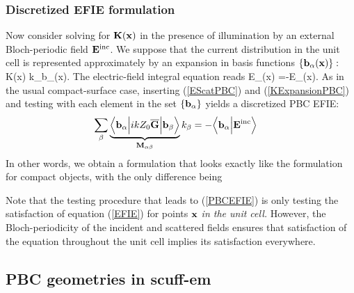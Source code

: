 \subsubsection{Discretized EFIE formulation}

Now consider solving for $\mathbf{K}(\mathbf{x})$ in the presence
of illumination by an external Bloch-periodic 
field $\mathbf{E}^{\hbox{\scriptsize{inc}}}$.
We suppose that the current distribution in the unit cell 
is represented approximately by an expansion in basis
functions $\{\mathbf{b}_\alpha(\mathbf{x})\}:$
{\vb K(\vb x) \approx k_\alpha \vb b_\alpha(\vb x).}
The electric-field integral equation reads
{\vb E_\parallel(\vb x)
   =-\vb E_\parallel(\vb x).
}
As in the usual compact-surface case, inserting (\ref{EScatPBC}) 
and (\ref{KExpansionPBC}) and testing with each element in the set 
$\{\mathbf{b}_\alpha\}$ yields a discretized PBC EFIE:
\begin{align}
 \sum_{\beta}
 \underbrace{
   \Big \langle \mathbf{b}_\alpha \Big|
   ikZ_0\overline{\mathbf{G}}    
   \Big| \mathbf{b}_\beta \Big\rangle
            }_{\mathbf{M}_{\alpha\beta}} 
   k_\beta
&=-\Big \langle \mathbf{b}_\alpha \Big | \mathbf{E}^{\hbox{\scriptsize{inc}}} \Big\rangle
\label{PBCEFIE}
\end{align}
In other words, we obtain a formulation that looks exactly
like the formulation for compact objects, with the only
difference being 

Note that the testing procedure that leads to 
(\ref{PBCEFIE}) is only testing the satisfaction
of equation (\ref{EFIE}) for points $\mathbf{x}$
\textit{in the unit cell.} However, the Bloch-periodicity
of the incident and scattered fields ensures that
satisfaction of the equation throughout the unit cell
implies its satisfaction everywhere.

\subsection{PBC geometries in {\sc scuff-em}}

